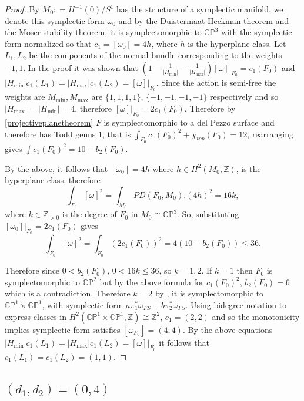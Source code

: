 \documentclass[12pt]{article}
\begin{document}
\begin{proof}
 By \cite[Theorem 10.1-10.2]{GS} $M_0 : = H^{-1}(0)/S^1$ has the structure of a symplectic manifold, we denote this symplectic form $\omega_0$ and by the Duistermaat-Heckman theorem and the Moser stability theorem, it is symplectomorphic to $\mathbb{CP}^3$ with the symplectic form normalized so that $c_{1} = [\omega_0] = 4h$, where $h$ is the hyperplane class. Let $L_1,L_{2}$ be the components of the normal bundle corresponding to the weights $-1,1$. In the proof \cite[Theorem 3.4]{L2} it was shown that $(1-\frac{1}{|H_{\min}|} - \frac{1}{|H_{\max}|} )[\omega]|_{F_0} = c_{1}(F_0)$ and $|H_{\min}|c_1(L_1) = |H_{\max}|c_1(L_2) = [\omega]|_{F_0}$. Since the action is semi-free the weights are $M_{\min},M_{\max}$ are $\{1,1,1,1\}$, $\{-1,-1,-1,-1\}$ respectively and so $|H_{\max}| = |H_{\min}|=4$, therefore $[\omega]|_{F_0} = 2c_{1}(F_0)$. Therefore by \ref{projectiveplanetheorem} $F$ is symplectomorphic to a del Pezzo surface and therefore has Todd genus $1$, that is $\int_{F_0} c_{1}(F_0)^2 + \chi_{top}(F_0) = 12$, rearranging gives $\int c_{1}(F_0)^{2} = 10 - b_{2}(F_0)$.


By the above, it follows that $[\omega_{0}] = 4h$ where $h \in H^{2}(M_0,\mathbb{Z})$, is the hyperplane class, therefore $$  \int_{F_0} [\omega]^2 = \int_{M_{0}} PD(F_0, M_{0}). (4h)^2 = 16k,$$ where $k \in \mathbb{Z}_{>0}$ is the degree of $F_0$ in $M_{0} \cong \mathbb{CP}^3$. So, substituting $[\omega_0]|_{F_0} = 2c_{1}(F_0)$ gives $$\int_{F_0} [\omega]^2 = \int_{F_0} (2 c_{1}(F_0))^2 = 4 (10 - b_{2}(F_0)) \leq 36. $$

 Therefore since $0 < b_{2}(F_0) $, $0<16k \leq 36$, so $k=1,2$. If $k=1$ then $F_0$ is symplectomorphic to $\mathbb{CP}^2$ but by the above formula for $c_{1}(F_0)^2$, $b_{2}(F_0)=6$ which is a contradiction. Therefore $k=2$ by \cite[Theorem 1.3]{H}, it is symplectomorphic to $\mathbb{CP}^1 \times \mathbb{CP}^1$, with symplectic form $a \pi_1^{*}\omega_{FS} +  b \pi_2^{*}\omega_{FS}$. Using bidegree notation to express classes in $H^{2}(\mathbb{CP}^1 \times \mathbb{CP}^1,\mathbb{Z}) \cong \mathbb{Z}^2$, $c_1 = (2,2)$ and so the monotonicity implies symplectic form satisfies $[\omega_{F_0}] =  (4,4)$. By the above equations $|H_{\min}|c_1(L_1) = |H_{\max}|c_1(L_2) = [\omega]|_{F_0}$ it follows that $c_{1}(L_{1}) = c_{1}(L_{2}) = (1,1)$. \end{proof}

\subsection{ $(d_1,d_2) = (0,4)$}
\end{document}

